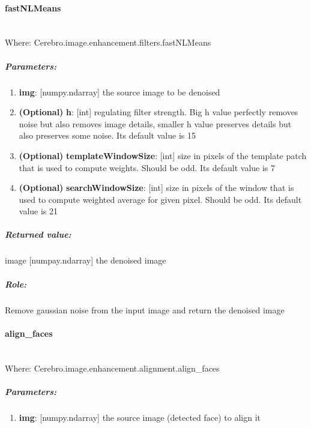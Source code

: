  	
\paragraph{fastNLMeans} \mbox{} \\
Where: Cerebro.image.enhancement.filters.fastNLMeans
\subparagraph{Parameters:}
\begin{changemargin}{0.5cm}{0cm}
	\begin{enumerate} 
		\item \textbf{img}: [numpy.ndarray] the source image to be denoised
		\item \textbf{(Optional)} \textbf{h}: [int] regulating filter strength. Big h value perfectly removes noise but also removes image details, smaller h value preserves details but also preserves some noise. Its default value is 15
		\item \textbf{(Optional)} \textbf{templateWindowSize}: [int] size in pixels of the template patch that is used to compute weights. Should be odd. Its default value is 7
		\item \textbf{(Optional)} \textbf{searchWindowSize}: [int] size in pixels of the window that is used to compute weighted average for given pixel. Should be odd. Its default value is 21
	\end{enumerate}
\end{changemargin}

\subparagraph{Returned value:}
\begin{changemargin}{1cm}{0cm}
	image [numpay.ndarray] the denoised image
\end{changemargin}

\subparagraph{Role:}
\begin{changemargin}{1cm}{0cm}
	Remove gaussian noise from the input image and return the denoised image
\end{changemargin}


\paragraph{align\_faces} \mbox{} \\
Where: Cerebro.image.enhancement.alignment.align\_faces
\subparagraph{Parameters:}
\begin{changemargin}{0.5cm}{0cm}
	\begin{enumerate} 
		\item \textbf{img}: [numpy.ndarray] the source image (detected face) to align it
	\end{enumerate}
\end{changemargin}


